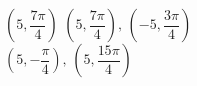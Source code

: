 { $\left( 5, \dfrac{7\pi}{4} \right)$}
{$\left( 5, \dfrac{7\pi}{4} \right), \, \left( -5, \dfrac{3\pi}{4} \right)$\\$\left( 5, -\dfrac{\pi}{4} \right), \, \left( 5, \dfrac{15\pi}{4} \right)$\\ }
